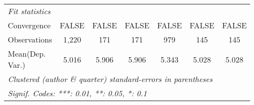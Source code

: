 \begin{tabular}{lcccccc}
   \midrule
   \emph{Fit statistics}\\
   Convergence             &FALSE    & FALSE  & FALSE         & FALSE   & FALSE   & FALSE\\  
   Observations            & 1,220   & 171    & 171           & 979     & 145     & 145\\  
Mean(Dep. Var.) & 5.016 & 5.906 & 5.906 & 5.343 & 5.028 & 5.028 \\
   \midrule \midrule
   \multicolumn{7}{l}{\emph{Clustered (author \& quarter) standard-errors in parentheses}}\\
   \multicolumn{7}{l}{\emph{Signif. Codes: ***: 0.01, **: 0.05, *: 0.1}}\\
\end{tabular}
\par\endgroup
